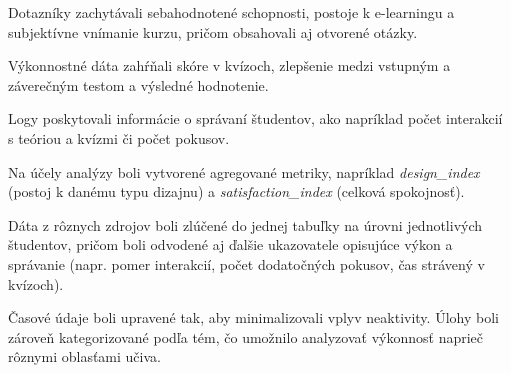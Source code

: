 Dotazníky zachytávali sebahodnotené schopnosti, postoje k e-learningu a subjektívne vnímanie kurzu, pričom obsahovali aj otvorené otázky. 

Výkonnostné dáta zahŕňali skóre v kvízoch, zlepšenie medzi vstupným a záverečným testom a výsledné hodnotenie. 

Logy poskytovali informácie o správaní študentov, ako napríklad počet interakcií s teóriou a kvízmi či počet pokusov.

Na účely analýzy boli vytvorené agregované metriky, napríklad \textit{design\_index} (postoj k danému typu dizajnu) a \textit{satisfaction\_index} (celková spokojnosť). 

Dáta z rôznych zdrojov boli zlúčené do jednej tabuľky na úrovni jednotlivých študentov, pričom boli odvodené aj ďalšie ukazovatele opisujúce výkon a správanie (napr. pomer interakcií, počet dodatočných pokusov, čas strávený v kvízoch). 

Časové údaje boli upravené tak, aby minimalizovali vplyv neaktivity. Úlohy boli zároveň kategorizované podľa tém, čo umožnilo analyzovať výkonnosť naprieč rôznymi oblasťami učiva.








